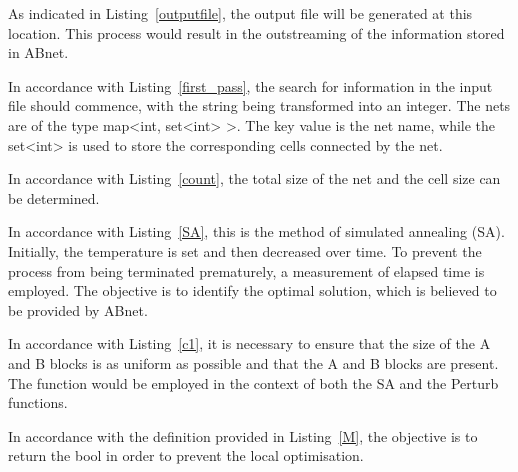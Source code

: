 \documentclass{article}
\begin{document}


As indicated in Listing~\ref{outputfile}, the output file will be generated at this location. This process would result in the outstreaming of the information stored in ABnet.




In accordance with Listing~\ref{first_pass}, the search for information in the input file should commence, with the string being transformed into an integer. The nets are of the type map<int, set<int> >. The key value is the net name, while the set<int> is used to store the corresponding cells connected by the net.



In accordance with Listing~\ref{count}, the total size of the net and the cell size can be determined.



In accordance with Listing~\ref{SA}, this is the method of simulated annealing (SA). Initially, the temperature is set and then decreased over time. To prevent the process from being terminated prematurely, a measurement of elapsed time is employed. The objective is to identify the optimal solution, which is believed to be provided by ABnet.



In accordance with Listing~\ref{c1}, it is necessary to ensure that the size of the A and B blocks is as uniform as possible and that the A and B blocks are present. The function would be employed in the context of both the SA and the Perturb functions.



In accordance with the definition provided in Listing~\ref{M}, the objective is to return the bool in order to prevent the local optimisation.


\end{document}
